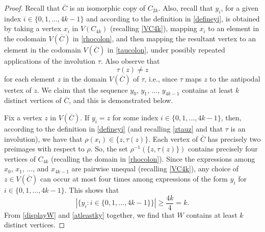 \documentclass[10pt,a4paper]{amsart}
\begin{document}
\begin{proof}
 Recall that $\overline{C}$ is an isomorphic copy of $C_{2k}$. Also, recall that $y_{i}$, for a given index $i \in \{ 0, 1, \ldots, 4 k - 1 \}$ and 
 according to the definition in \eqref{defineyi}, is obtained by taking a vertex $x_{i}$ in $V(C_{4k})$ (recalling \eqref{VC4k}), mapping 
 $x_i$ to an element in the codomain $V(\overline{C})$ in \eqref{rhocolon}, and then mapping the resultant vertex to an element in 
 the codomain $V(\overline{C})$ in \eqref{taucolon}, under possibly repeated applications of the involution $\tau$. Also observe that 
\begin{equation}\label{ztauz}
 \tau(z) \neq z
\end{equation}
 for each element $z$	 in the domain $V(\overline{C})$ of $\tau$, i.e., since $\tau$ maps $z$ to the antipodal vertex of $z$. We claim 
 that the sequence $y_{0}$, $y_{1}$, $\ldots$, $y_{4k-1}$ contains at least $k$ distinct vertices of $\overline{C}$, and this is 
 demonstrated below. 

 Fix a vertex $z$ in $V(\overline{C})$. If $y_{i} = z$ for some index $i \in \{ 0, 1, \ldots, 4 k - 1 \}$, then, according to the definition 
 in \eqref{defineyi} (and recalling \eqref{ztauz} and that $\tau$ is an involution), we have that $\rho(x_{i}) \in \{ z, \tau(z) \}$. Each vertex 
 of $\overline{C}$ has precisely two preimages with respect to $\rho$. So, the set $\rho^{-1}(\{ z, \tau(z) \})$ contains precisely four 
 vertices of $C_{4k}$ (recalling the domain in \eqref{rhocolon}). Since the expressions among $x_0$, $x_1$, $\ldots$, and $ x_{4k-1}$ 
 are pairwise unequal (recalling \eqref{VC4k}), any choice of $z \in V(\overline{C})$ can occur at most four times among expressions of 
 the form $y_{i}$ for $i \in \{ 0, 1, \ldots, 4 k - 1 \}$. This shows that 
\begin{equation}\label{atleastky}
 | \{ y_{i} : i \in \{ 0, 1, \ldots, 4 k - 1 \} \} |
 \geq \frac{4k}{4} = k. 
\end{equation}
 From \eqref{displayW} and \eqref{atleastky} together, we find that $W$ contains at 
 least $k$ distinct vertices. 


\end{proof}
\end{document}
